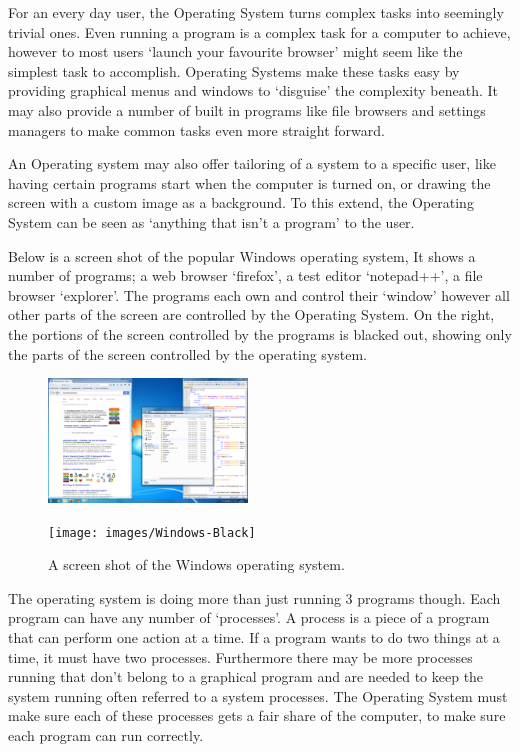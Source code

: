 \documentclass[a4paper]{report}
\begin{document}
For an every day user, the Operating System turns complex tasks into seemingly trivial ones. Even running a program is a complex task for a computer to achieve, however to most users `launch your favourite browser' might seem like the simplest task to accomplish. Operating Systems make these tasks easy by providing graphical menus and windows to `disguise' the complexity beneath. It may also provide a number of built in programs like file browsers and settings managers to make common tasks even more straight forward.

An Operating system may also offer tailoring of a system to a specific user, like having certain programs start when the computer is turned on, or drawing the screen with a custom image as a background. To this extend, the Operating System can be seen as `anything that isn't a program' to the user.

Below is a screen shot of the popular Windows operating system, It shows a number of programs; a web browser `firefox', a test editor `notepad++', a file browser `explorer'. The programs each own and control their `window' however all other parts of the screen are controlled by the Operating System. On the right, the portions of the screen controlled by the programs is blacked out, showing only the parts of the screen controlled by the operating system.


\begin{figure}[ht]
\centering
\begin{minipage}{.5\textwidth}
  \centering
  \includegraphics[width=200px]{images/Windows}
  \label{fig:WinProcManScreen}
\end{minipage}%
\begin{minipage}{.5\textwidth}
  \centering
  \texttt{[image: images/Windows-Black]}
  \label{fig:LinProcManScreen}
\end{minipage}
  \caption{A screen shot of the Windows operating system.}
\end{figure}

The operating system is doing more than just running 3 programs though. Each program can have any number of `processes'. A process is a piece of a program that can perform one action at a time. If a program wants to do two things at a time, it must have two processes. Furthermore there may be more processes running that don't belong to a graphical program and are needed to keep the system running often referred to a system processes. The Operating System must make sure each of these processes gets a fair share of the computer, to make sure each program can run correctly.
\end{document}
